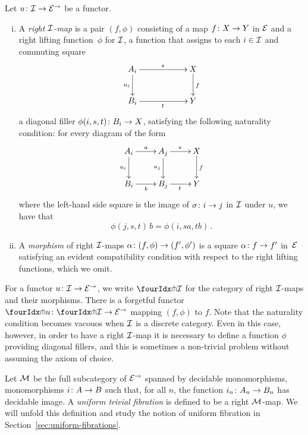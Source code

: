\documentclass[reqno,10pt,a4paper,oneside]{amsart}
\begin{document}
 \begin{definition} Let $u \co \cal{I} \to \catE^\to$ be a functor. 
 \begin{enumerate}[(i)] 
 \item  A \emph{right $\cal{I}$-map}
 is a pair $(f, \phi)$ consisting of a map $f \co X \to Y$ in $\cal{E}$ and a right lifting function~$\phi$ for $\cal{I}$, \ie 
 a function that assigns to each $i \in \cal{I}$ and commuting square
\[
\xymatrix@C=2cm{
A_i \ar[r]^{s}   \ar[d]_{u_i} & X \ar[d]^f \\
B_i \ar[r]_{t} & Y}
\]
a diagonal filler $\phi(i,s, t) \co B_i \to X$, satisfying the following naturality 
condition: for every diagram of the form
\[
\xymatrix{
A_i \ar[r]^a \ar[d]_{u_i} & A_j \ar[r]^{s}  \ar[d]_{u_j} & X \ar[d]^f   \\
B_i \ar[r]_{b}  & B_j  \ar[r]_{t}  & Y }
\]
where the left-hand side square is the image of $\sigma \co i \to j$ in $\cal{I}$ under $u$, 
we have that 
\[
\phi(j, s, t) \, b = \phi(i, s  a, t  b) \, .
\]
\item A \emph{morphism} of right $\cal{I}$-maps $\alpha \co (f, \phi) \to (f', \phi')$ is a 
square $\alpha \co f \to f'$ in~$\catE$ satisfying an evident compatibility condition 
with respect to the right lifting functions, which we omit. 
\end{enumerate}
\end{definition}

For a functor $u \co \cal{I} \to \catE^\to$, we write $\liftr{\cal{I}}$ for the category  of 
right $\cal{I}$-maps and their morphisms. There is a forgetful functor~$\liftr{u} \co \liftr{\cal{I}} \to \catE^\to$
mapping $(f, \phi)$ to $f$. Note that the naturality condition becomes vacouos when $\cal{I}$ is a discrete category. Even in this case, however, in order to have a right $\cal{I}$-map it is necessary to define a function $\phi$ providing 
diagonal fillers, and this is sometimes a non-trivial problem without assuming the axiom of choice.



\begin{example}  \label{exa-triv-kan-fib}
Let $\cal{M}$ be the full subcategory of $\cal{E}^\to$ spanned by decidable monomorphisms, \ie
monomorphisms $i \co A \to B$ such that, for all $n$, the function $i_n \co A_n \to B_n$ has decidable
image. A \emph{uniform trivial fibration} is defined to be a right $\cal{M}$-map. We will unfold this
definition and study the notion of uniform  fibration in Section~\ref{sec:uniform-fibrations}.
\end{example}
\end{document}
